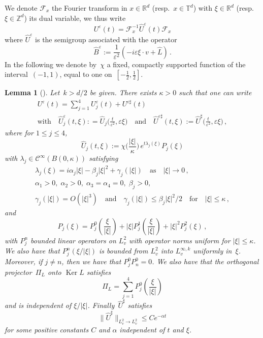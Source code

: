 \documentclass[11pt]{article}
\newtheorem{lemm}[theo]{Lemma}
\theoremstyle{definition}
\numberwithin{equation}{section}
\numberwithin{figure}{section}
\numberwithin{table}{section}
\newcommand*\R {\mathbb{R}}
\newcommand*\T {\mathbb{T}}
\newcommand*\Z {\mathbb{Z}}
\newcommand*\eps{{\varepsilon}}
\newcommand*\e{{\varepsilon}}
\begin{document}
We denote $\mathcal{F}_x$ the Fourier transform in $x \in \R^d$ (resp.~$x \in \T^d$) with $\xi \in \R^d$ (resp.~$\xi \in \Z^d$) its dual variable, we thus write
\[
U^\e(t) = \mathcal{F}_x^{-1} \widehat U^\e(t) \mathcal{F}_x
\]
where $\widehat U^\e$ is the semigroup associated with the operator
\[
\widehat B^\e:=\frac{1}{\e^2}(-i\e \xi \cdot v +\widehat L)\,.
\]
In the following we denote by~$\chi$ a fixed, compactly supported function of the interval~$(-1,1)$, equal to one on~$[-\frac12, \frac12]$.
\begin{lemm}[\cite{Ellis-Pinsky}] \label{EllisPinsky}
Let~${k>d/2}$ be given. There exists $\kappa>0$ such that one can write
\begin{multline}\label{decompUeps}
U^\eps(t) =\sum_{j=1}^4 U^\eps_j(t) + U^{\eps\sharp}(t) \\
\text{with} \quad \widehat U_j^\e(t,\xi): = \widehat U _j\Big(\frac{t}{\e^2},\e \xi\Big) \quad \text{and}\quad \widehat U^{\eps\sharp}(t,\xi):= \widehat U^{\sharp}\Big(\frac{t}{\e^2},\e \xi\Big) \,,
\end{multline}
where for $1 \le j \le 4$,
\[
\widehat U _j(t,\xi) := \chi\Big(\frac{|\xi|}\kappa\Big) \, e^{t \lambda_j(\xi)} P_j(\xi)
\]
with $\lambda_j \in \mathcal{C}^\infty(B(0,\kappa))$ satisfying
\begin{equation}\label{estimatelambdaj}
\begin{gathered}
\lambda_j(\xi) = i \alpha_j |\xi| - \beta_j|\xi|^2 + \gamma_j(|\xi|) \quad\text{as} \quad |\xi|\to 0
\,,\\
\alpha_1>0,\;\alpha_2>0,\;\alpha_3= \alpha_4=0,\;\beta_j>0 , \\ \gamma_j(|\xi|) =O(|\xi|^3) 
\quad\text{and}\quad \gamma_j(|\xi|) \le \beta_j |\xi|^2/2\quad \text{for} \quad |\xi|\le \kappa\,,
\end{gathered}
\end{equation}
and
\[
P_j(\xi) = P_{j}^0\left(\frac{\xi}{|\xi|}\right) +|\xi| P_{j}^1\left(\frac{\xi}{|\xi|}\right) + |\xi|^2 P_{j}^2(\xi)\,,
\]
with $P_{j}^n$ bounded linear operators on $L^2_v$ with operator norms uniform for $|\xi| \le \kappa$. We also have that $P_{j}^n(\xi/|\xi|)$ is bounded from $L^2_v$ into $L^{\infty,k}_v$ uniformly in~$\xi$. Moreover, if $j \neq n$, then we have that $P^0_j P^0_n=0$. We also have that the orthogonal projector~$\Pi_{L} $ onto $\operatorname{Ker} L$ satisfies
\[
\Pi_{L} = \sum_{j=1}^4 P_{j}^0\left(\frac{\xi}{|\xi|}\right)
\]
and is independent of $\xi/|\xi|$. Finally~$ \widehat U^\sharp$ satisfies
\begin{equation}\label{rateUsharp}
\big\|\widehat U^\sharp \big\|_{L^2_v \to L^2_v} \le C e^{-\alpha t}
\end{equation}
for some positive constants $C$ and $\alpha$ independent of $t$ and $\xi$.
\end{lemm}
\end{document}
